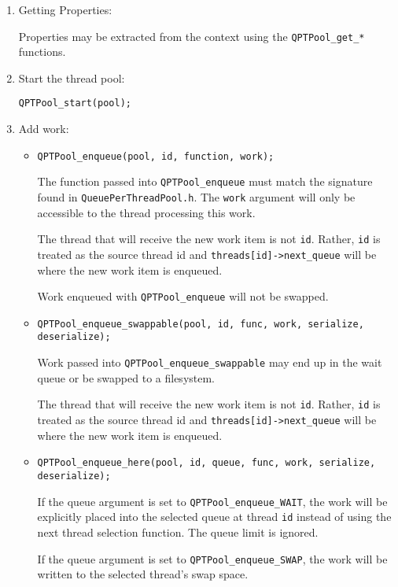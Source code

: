 \begin{enumerate}
\item Getting Properties:

  Properties may be extracted from the context using the
  \texttt{QPTPool\_get\_*} functions.

\item Start the thread pool:

  \texttt{QPTPool\_start(pool);}

\item Add work:

  \begin{itemize}
    \item \texttt{QPTPool\_enqueue(pool, id, function, work);}

    The function passed into \texttt{QPTPool\_enqueue} must match the
    signature found in \texttt{QueuePerThreadPool.h}. The
    \texttt{work} argument will only be accessible to the thread
    processing this work.

    The thread that will receive the new work item is not \texttt{id}.
    Rather, \texttt{id} is treated as the source thread id and
    \texttt{threads[id]->next\_queue} will be where the new work item
    is enqueued.

    Work enqueued with \texttt{QPTPool\_enqueue} will not be swapped.

    \item \texttt{QPTPool\_enqueue\_swappable(pool, id, func, work, serialize, deserialize);}

    Work passed into \texttt{QPTPool\_enqueue\_swappable} may end up
    in the wait queue or be swapped to a filesystem.

    The thread that will receive the new work item is not \texttt{id}.
    Rather, \texttt{id} is treated as the source thread id and
    \texttt{threads[id]->next\_queue} will be where the new work item
    is enqueued.

    \item \texttt{QPTPool\_enqueue\_here(pool, id, queue, func, work, serialize, deserialize);}

    If the queue argument is set to \texttt{QPTPool\_enqueue\_WAIT},
    the work will be explicitly placed into the selected queue at
    thread \texttt{id} instead of using the next thread selection
    function. The queue limit is ignored.

    If the queue argument is set to \texttt{QPTPool\_enqueue\_SWAP},
    the work will be written to the selected thread's swap space.
  \end{itemize}


\end{enumerate}

